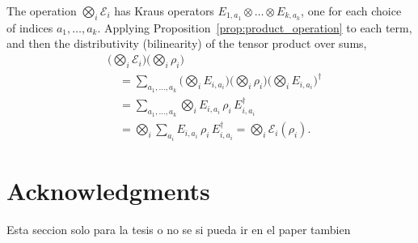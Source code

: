 \documentclass{ieeeaccess}
\begin{document}
\begin{IEEEproof}
  The operation $\bigotimes_i \mathcal{E}_i$ has Kraus operators $E_{1,a_1} \otimes \dots \otimes E_{k,a_k}$, one for each choice of indices $a_1, \dots, a_k$. Applying Proposition~\ref{prop:product_operation} to each term, and then the distributivity (bilinearity) of the tensor product over sums,
  \begin{align*}
    &\Big(\bigotimes_{i} \mathcal{E}_i\Big)\Big(\bigotimes_{i} \rho_i\Big) \\
    &\quad= \sum_{a_1, \dots, a_k} \Big(\bigotimes_{i} E_{i,a_i}\Big)\Big(\bigotimes_{i} \rho_i\Big)\Big(\bigotimes_{i} E_{i,a_i}\Big)^{\dagger} \\
    &\quad= \sum_{a_1, \dots, a_k} \bigotimes_{i} E_{i,a_i}\, \rho_i\, E_{i,a_i}^{\dagger} \\
    &\quad= \bigotimes_{i} \sum_{a_i} E_{i,a_i}\, \rho_i\, E_{i,a_i}^{\dagger}
       = \bigotimes_{i} \mathcal{E}_i(\rho_i).
  \end{align*}
\end{IEEEproof}

\clearpage
\raggedbottom
\section*{Acknowledgments}
\label{sec:acknowledgment}

Esta seccion solo para la tesis o no se si pueda ir en el paper tambien





\EOD 
\end{document}
